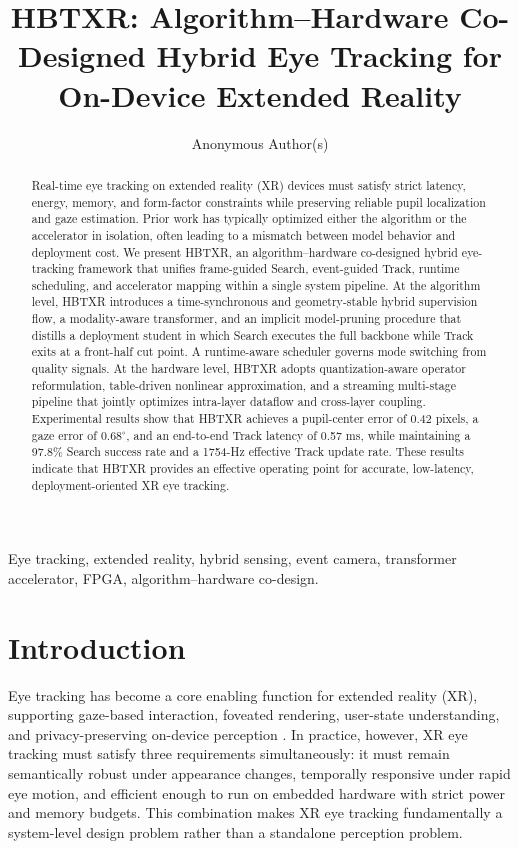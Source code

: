 \documentclass[journal]{IEEEtran}
\title{HBTXR: Algorithm--Hardware Co-Designed Hybrid Eye Tracking for On-Device Extended Reality}
\author{Anonymous Author(s)}
\begin{document}
\maketitle

\begin{abstract}
Real-time eye tracking on extended reality (XR) devices must satisfy strict latency, energy, memory, and form-factor constraints while preserving reliable pupil localization and gaze estimation. Prior work has typically optimized either the algorithm or the accelerator in isolation, often leading to a mismatch between model behavior and deployment cost. We present HBTXR, an algorithm--hardware co-designed hybrid eye-tracking framework that unifies frame-guided Search, event-guided Track, runtime scheduling, and accelerator mapping within a single system pipeline. At the algorithm level, HBTXR introduces a time-synchronous and geometry-stable hybrid supervision flow, a modality-aware transformer, and an implicit model-pruning procedure that distills a deployment student in which Search executes the full backbone while Track exits at a front-half cut point. A runtime-aware scheduler governs mode switching from quality signals. At the hardware level, HBTXR adopts quantization-aware operator reformulation, table-driven nonlinear approximation, and a streaming multi-stage pipeline that jointly optimizes intra-layer dataflow and cross-layer coupling. Experimental results show that HBTXR achieves a pupil-center error of 0.42 pixels, a gaze error of $0.68^{\circ}$, and an end-to-end Track latency of 0.57 ms, while maintaining a 97.8\% Search success rate and a 1754-Hz effective Track update rate. These results indicate that HBTXR provides an effective operating point for accurate, low-latency, deployment-oriented XR eye tracking.
\end{abstract}

\begin{IEEEkeywords}
Eye tracking, extended reality, hybrid sensing, event camera, transformer accelerator, FPGA, algorithm--hardware co-design.
\end{IEEEkeywords}

\section{Introduction}
Eye tracking has become a core enabling function for extended reality (XR), supporting gaze-based interaction, foveated rendering, user-state understanding, and privacy-preserving on-device perception \cite{ref1,ref2}. In practice, however, XR eye tracking must satisfy three requirements simultaneously: it must remain semantically robust under appearance changes, temporally responsive under rapid eye motion, and efficient enough to run on embedded hardware with strict power and memory budgets. This combination makes XR eye tracking fundamentally a system-level design problem rather than a standalone perception problem.
\end{document}
